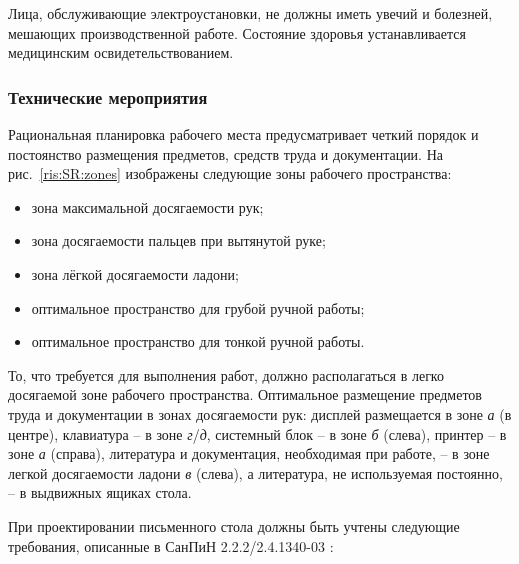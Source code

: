 Лица, обслуживающие электроустановки, не должны иметь увечий и болезней, мешающих производственной работе.
Состояние здоровья устанавливается медицинским освидетельствованием.

\subsubsection{Технические мероприятия} %

Рациональная планировка рабочего места предусматривает четкий порядок и постоянство размещения предметов, средств труда и документации. 
На рис.~\ref{ris:SR:zones} изображены следующие зоны рабочего пространства:

\begin{itemize}
    \item зона максимальной досягаемости рук;
    \item зона досягаемости пальцев при вытянутой руке;
    \item зона лёгкой досягаемости ладони;
    \item оптимальное пространство для грубой ручной работы;
    \item оптимальное пространство для тонкой ручной работы.
\end{itemize}


То, что требуется для выполнения работ, должно располагаться в легко досягаемой зоне рабочего пространства.
Оптимальное размещение предметов труда и документации в зонах досягаемости рук: дисплей размещается в зоне \textit{а} (в центре), клавиатура -- в зоне \textit{г}/\textit{д}, системный блок -- в зоне \textit{б} (слева), принтер -- в зоне \textit{а} (справа), литература и документация, необходимая при работе, -- в зоне легкой досягаемости ладони \textit{в} (слева), а литература, не используемая постоянно, -- в выдвижных ящиках стола. 

При проектировании письменного стола должны быть учтены следующие требования, описанные в СанПиН 2.2.2/2.4.1340-03 \cite{SanPin2003}:

